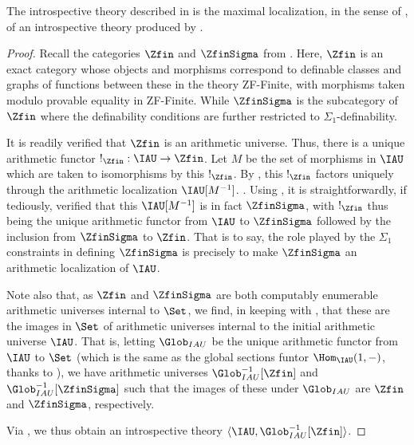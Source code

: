 \begin{observation}
The introspective theory described in  is the maximal localization, in the sense of , of an introspective theory produced by .
\end{observation}
\begin{proof}
Recall the categories $\Zfin$ and $\ZfinSigma$ from . Here, $\Zfin$ is an exact category whose objects and morphisms correspond to definable classes and graphs of functions between these in the theory ZF-Finite, with morphisms taken modulo provable equality in ZF-Finite. While $\ZfinSigma$ is the subcategory of $\Zfin$ where the definability conditions are further restricted to $\Sigma_1$-definability.

It is readily verified that $\Zfin$ is an arithmetic universe. Thus, there is a unique arithmetic functor $!_{\Zfin} : \IAU \to \Zfin$. Let $M$ be the set of morphisms in $\IAU$ which are taken to isomorphisms by this $!_{\Zfin}$. By , this $!_{\Zfin}$ factors uniquely through the arithmetic localization $\IAU[M^{-1}]$. . Using , it is straightforwardly, if tediously, verified that this $\IAU[M^{-1}]$ is in fact $\ZfinSigma$, with $!_{\Zfin}$ thus being the unique arithmetic functor from $\IAU$ to $\ZfinSigma$ followed by the inclusion from $\ZfinSigma$ to $\Zfin$. That is to say, the role played by the $\Sigma_1$ constraints in defining $\ZfinSigma$ is precisely to make $\ZfinSigma$ an arithmetic localization of $\IAU$.

Note also that, as $\Zfin$ and $\ZfinSigma$ are both computably enumerable arithmetic universes internal to $\Set$, we find, in keeping with , that these are the images in $\Set$ of arithmetic universes internal to the initial arithmetic universe $\IAU$. That is, letting $\Glob_{IAU}$ be the unique arithmetic functor from $\IAU$ to $\Set$ (which is the same as the global sections funtor $\Hom_{\IAU}(1, -)$, thanks to ), we have arithmetic universes $\Glob_{IAU}^{-1}[\Zfin]$ and $\Glob_{IAU}^{-1}[\ZfinSigma]$ such that the images of these under $\Glob_{IAU}$ are $\Zfin$ and $\ZfinSigma$, respectively.

Via , we thus obtain an introspective theory $\langle \IAU, \Glob_{IAU}^{-1}[\Zfin] \rangle$.


\end{proof}
